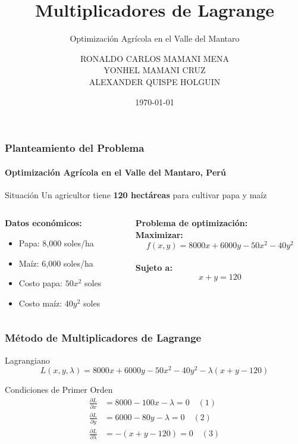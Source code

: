 \documentclass{beamer}
\title{Multiplicadores de Lagrange}
\subtitle{Optimización Agrícola en el Valle del Mantaro}
\author{RONALDO CARLOS MAMANI MENA\\ YONHEL MAMANI CRUZ\\ ALEXANDER QUISPE HOLGUIN}
\institute{Universidad Nacional Del Altiplano de Puno}
\date{\today}
\begin{document}
\frame{\titlepage}

\begin{frame}
\frametitle{Planteamiento del Problema}
\framesubtitle{Optimización Agrícola en el Valle del Mantaro, Perú}

\begin{block}{Situación}
Un agricultor tiene \textbf{120 hectáreas} para cultivar papa y maíz
\end{block}

\begin{columns}
\begin{column}{0.5\textwidth}
\textbf{Datos económicos:}
\begin{itemize}
\item Papa: 8,000 soles/ha
\item Maíz: 6,000 soles/ha
\item Costo papa: $50x^2$ soles
\item Costo maíz: $40y^2$ soles
\end{itemize}
\end{column}
\begin{column}{0.5\textwidth}
\textbf{Problema de optimización:}
\\[0.3cm]
\textbf{Maximizar:}
$$f(x,y) = 8000x + 6000y - 50x^2 - 40y^2$$
\\[0.2cm]
\textbf{Sujeto a:}
$$x + y = 120$$
\end{column}
\end{columns}

\end{frame}

\begin{frame}
\frametitle{Método de Multiplicadores de Lagrange}

\begin{block}{Lagrangiano}
$$L(x,y,\lambda) = 8000x + 6000y - 50x^2 - 40y^2 - \lambda(x + y - 120)$$
\end{block}

\begin{block}{Condiciones de Primer Orden}
\begin{align}
\frac{\partial L}{\partial x} &= 8000 - 100x - \lambda = 0 \quad (1)\\
\frac{\partial L}{\partial y} &= 6000 - 80y - \lambda = 0 \quad (2)\\
\frac{\partial L}{\partial \lambda} &= -(x + y - 120) = 0 \quad (3)
\end{align}
\end{block}

\end{frame}
\end{document}
